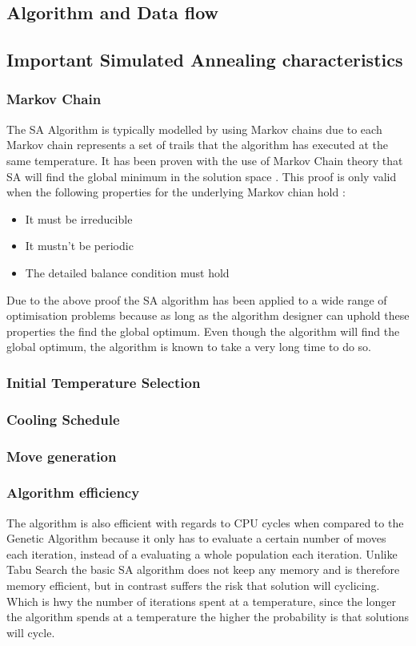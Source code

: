 \subsection{Algorithm and Data flow}

\subsection{Important Simulated Annealing characteristics}
\subsubsection{Markov Chain}
The SA Algorithm is typically modelled by using Markov chains due to each Markov chain represents a set of trails that the algorithm has executed at the same temperature.  It has been proven with the use of Markov Chain theory that SA will find the global minimum in the solution space \cite{ClusterSA}. This proof is only valid when the following properties for the underlying Markov chian hold \cite{VeryFastSAImageEnchancement}:
\begin{itemize}
\item It must be irreducible
\item It mustn't be periodic
\item The detailed balance condition must hold
\end{itemize}
Due to the above proof the SA algorithm has been applied to a wide range of optimisation problems because as long as the algorithm designer can uphold these properties the find the global optimum. Even though the algorithm will find the global optimum, the algorithm is known to take a very long time to do so.
\subsubsection{Initial Temperature Selection}
\subsubsection{Cooling Schedule}
\subsubsection{Move generation}
\subsubsection{Algorithm efficiency}
The algorithm is also efficient with regards to CPU cycles when compared to the Genetic Algorithm because it only has to evaluate a certain number of moves each iteration, instead of a evaluating a whole population each iteration. Unlike Tabu Search the basic SA algorithm does not keep any memory and is therefore memory efficient, but in contrast suffers the risk that solution will cyclicing. Which is hwy the number of iterations spent at a temperature, since the longer the algorithm spends at a temperature the higher the probability is that solutions will cycle.
